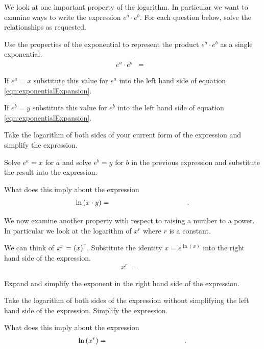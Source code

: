 \begin{problem}
\item We look at one important property of the logarithm. In
  particular we want to examine ways to write the expression
  $e^a\cdot e^b$. For each question below, solve the relationships as
  requested.
  \begin{subproblem}
  \item Use the properties of the exponential to represent the product
    $e^a\cdot e^b$ as a single exponential.
    \label{subprob:exponentialExpansion}
    \begin{eqnarray}
      \label{eqn:exponentialExpansion}
      e^a \cdot e^b & = &
    \end{eqnarray}
  \item If $e^a=x$ substitute this value for $e^a$ into the left hand
    side of equation \ref{eqn:exponentialExpansion}.
    \vspace{4em}
  \item If $e^b=y$ substitute this value for $e^b$ into the left hand
    side of equation \ref{eqn:exponentialExpansion}.
    \vspace{4em}
  \item Take the logarithm of both sides of your current form of the
    expression and simplify the expression.
    \vfill
  \item Solve $e^a=x$ for $a$ and solve $e^b=y$ for $b$ in the
    previous expression and substitute the result into the expression.
    \vfill
  \item What does this imply about the expression
    \begin{eqnarray*}
      \ln\lp x \cdot y \rp & = & \hspace{10em}.
    \end{eqnarray*}
  \end{subproblem}

  \clearpage

\item We now examine another property with respect to raising a number
  to a power. In particular we look at the logarithm of $x^r$ where
  $r$ is a constant.
  \begin{subproblem}
  \item We can think of $x^r=\left( x \right)^r$. Substitute the identity
    $x=e^{\ln(x)}$ into the right hand side of the expression.
    \begin{eqnarray}
      \label{eqn:exponentialMultiplication}
      x^r & = &
    \end{eqnarray}
    \item Expand and simplify the exponent in the right hand side of
      the expression.
      \vfill
    \item Take the logarithm of both sides of the expression without
      simplifying the left hand side of the expression. Simplify the
      expression.
      \vfill
    \item What does this imply about the expression
    \begin{eqnarray*}
      \ln\lp x^r \rp & = & \hspace{10em}.
    \end{eqnarray*}
  \end{subproblem}



\end{problem}
